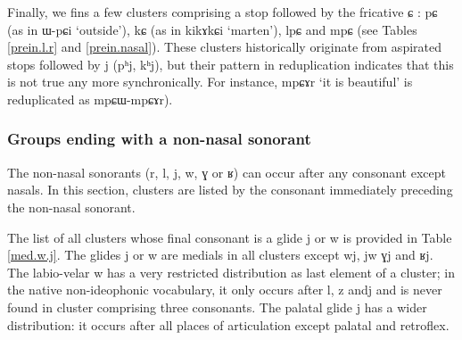 \documentclass[oldfontcommands,oneside,a4paper,11pt]{article}
\newcommand{\ipa}[1]{{\phon #1}} %
\begin{document}
Finally, we fins a few clusters comprising a stop followed by the fricative \ipa{ɕ} :  \ipa{pɕ}  (as in \ipa{ɯ-pɕi}  `outside'),  \ipa{kɕ}  (as in \ipa{kikɤkɕi}  `marten'), \ipa{lpɕ} and \ipa{mpɕ} (see Tables \ref{prein.l.r} and  \ref{prein.nasal}). These clusters historically originate from aspirated stops followed by \ipa{j} (\ipa{pʰj}, \ipa{kʰj}), but their pattern in reduplication indicates that this is not true any more synchronically. For instance, \ipa{mpɕɤr} `it is beautiful' is reduplicated as \ipa{mpɕɯ-mpɕɤr}).

 \subsubsection{Groups ending with a non-nasal sonorant } \label{sec:medial}
  The non-nasal sonorants (\ipa{r}, \ipa{l}, \ipa{j}, \ipa{w}, \ipa{ɣ} or \ipa{ʁ}) can occur after any consonant except nasals. In this section, clusters are listed by the consonant immediately preceding the non-nasal sonorant.  
  
  
  
  The list of all clusters whose final consonant is a glide  \ipa{j} or \ipa{w} is provided in Table \ref{med.w.j}. The glides  \ipa{j} or \ipa{w} are medials in all clusters except \ipa{wj}, \ipa{jw} \ipa{ɣj} and \ipa{ʁj}. The labio-velar \ipa{w} has a very restricted distribution as last element of a cluster; in the native non-ideophonic vocabulary, it only occurs after \ipa{l}, \ipa{z} and{j} and is never found in cluster comprising three consonants. The palatal glide \ipa{j} has a wider distribution: it occurs after all places of articulation except palatal and retroflex.
  
  
  
\end{document}
